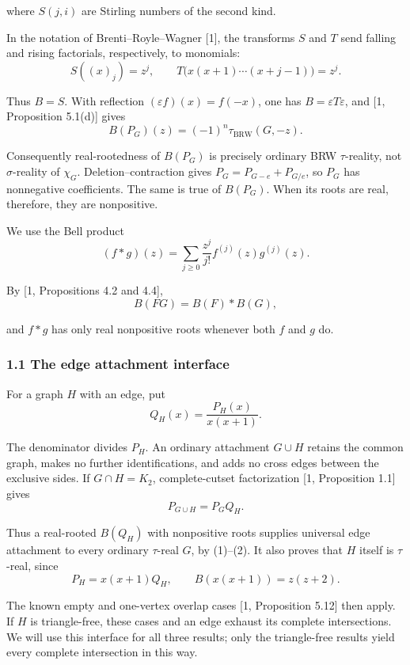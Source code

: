 \documentclass[
  11pt,
  a4paper,
]{article}
\begin{document}
where \(S(j,i)\) are Stirling numbers of the second kind.

In the notation of Brenti--Royle--Wagner {[}1{]}, the transforms \(S\)
and \(T\) send falling and rising factorials, respectively, to
monomials:
\nopagebreak
\[
S((x)_j)=z^j,\qquad
T\bigl(x(x+1)\cdots(x+j-1)\bigr)=z^j.
\]

Thus \(B=S\). With reflection \((\varepsilon f)(x)=f(-x)\), one has
\(B=\varepsilon T\varepsilon\), and {[}1, Proposition 5.1(d){]} gives
\nopagebreak
\[
B(P_G)(z)=(-1)^n\tau_{\mathrm{BRW}}(G,-z).\tag{1}
\]

Consequently real-rootedness of \(B(P_G)\) is precisely ordinary BRW
\(\tau\)-reality, not \(\sigma\)-reality of \(\chi_G\).
Deletion--contraction gives \(P_G=P_{G-e}+P_{G/e}\), so \(P_G\) has
nonnegative coefficients. The same is true of \(B(P_G)\). When its roots
are real, therefore, they are nonpositive.

We use the Bell product
\nopagebreak
\[
(f*g)(z)=\sum_{j\geq0}\frac{z^j}{j!}f^{(j)}(z)g^{(j)}(z).
\]

By {[}1, Propositions 4.2 and 4.4{]},
\nopagebreak
\[
B(FG)=B(F)*B(G),\tag{2}
\]

and \(f*g\) has only real nonpositive roots whenever both \(f\) and
\(g\) do.

\subsubsection{1.1 The edge attachment
interface}\label{the-edge-attachment-interface}

For a graph \(H\) with an edge, put
\nopagebreak
\[
Q_H(x)=\frac{P_H(x)}{x(x+1)}.
\]

The denominator divides \(P_H\). An ordinary attachment \(G\cup H\)
retains the common graph, makes no further identifications, and adds no
cross edges between the exclusive sides. If \(G\cap H=K_2\),
complete-cutset factorization {[}1, Proposition 1.1{]} gives
\nopagebreak
\[
P_{G\cup H}=P_GQ_H.\tag{3}
\]

Thus a real-rooted \(B(Q_H)\) with nonpositive roots supplies universal
edge attachment to every ordinary \(\tau\)-real \(G\), by (1)--(2). It
also proves that \(H\) itself is \(\tau\)-real, since
\nopagebreak
\[
P_H=x(x+1)Q_H,\qquad B(x(x+1))=z(z+2).
\]

The known empty and one-vertex overlap cases {[}1, Proposition 5.12{]}
then apply. If \(H\) is triangle-free, these cases and an edge exhaust
its complete intersections. We will use this interface for all three
results; only the triangle-free results yield every complete
intersection in this way.
\end{document}
